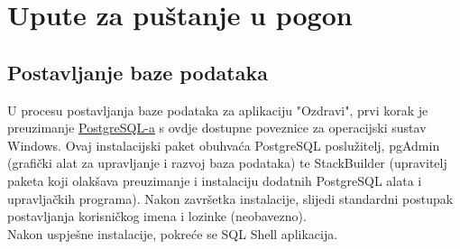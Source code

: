 		\section{Upute za puštanje u pogon}
		
		
			
			
	\subsection*{Postavljanje baze podataka}
	U procesu postavljanja baze podataka za aplikaciju "Ozdravi", prvi korak je preuzimanje 
	\href{https://www.postgresql.org/download/}{PostgreSQL-a} s ovdje dostupne poveznice za operacijski 
	sustav Windows. Ovaj instalacijski paket obuhvaća PostgreSQL poslužitelj, pgAdmin 
	(grafički alat za upravljanje i razvoj baza podataka) te StackBuilder (upravitelj paketa koji 
	olakšava preuzimanje i instalaciju dodatnih PostgreSQL alata i upravljačkih programa). Nakon završetka 
	instalacije, slijedi standardni postupak postavljanja korisničkog imena i lozinke (neobavezno). \\
	Nakon uspješne instalacije, pokreće se SQL Shell aplikacija.	\\
	
